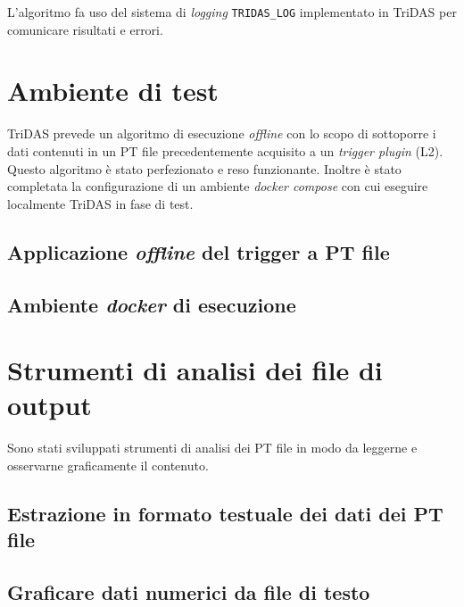 \documentclass[../main.tex]{subfiles}
\begin{document}
L'algoritmo fa uso del sistema di \emph{logging} \texttt{TRIDAS\_LOG} implementato in TriDAS per comunicare risultati e errori. 

\section{Ambiente di test}
TriDAS prevede un algoritmo di esecuzione \emph{offline} con lo scopo di sottoporre i dati contenuti in un PT file precedentemente acquisito a un \emph{trigger plugin} (L2). Questo algoritmo è stato perfezionato e reso funzionante. Inoltre è stato completata la configurazione di un ambiente \emph{docker compose} con cui eseguire localmente TriDAS in fase di test. 
\subsection{Applicazione \emph{offline} del trigger a PT file}

\subsection{Ambiente \emph{docker} di esecuzione}

\section{Strumenti di analisi dei file di output}
Sono stati sviluppati strumenti di analisi dei PT file in modo da leggerne e osservarne graficamente il contenuto.
\subsection{Estrazione in formato testuale dei dati dei PT file}
\subsection{Graficare dati numerici da file di testo}
\end{document}
